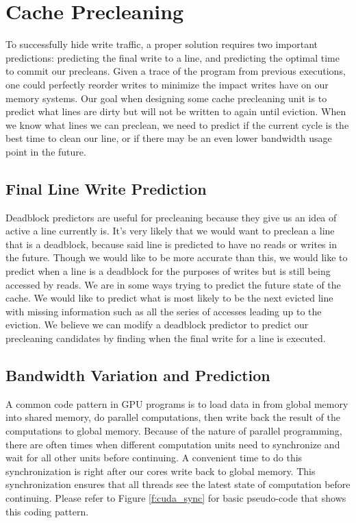 \section{Cache Precleaning}

To successfully hide write traffic, a proper solution requires two important predictions: predicting the final write to a line, and predicting the optimal time to commit our precleans. Given a trace of the program from previous executions, one could perfectly reorder writes to minimize the impact writes have on our memory systems. Our goal when designing some cache precleaning unit is to predict what lines are dirty but will not be written to again until eviction. When we know what lines we can preclean, we need to predict if the current cycle is the best time to clean our line, or if there may be an even lower bandwidth usage point in the future.  

\subsection{Final Line Write Prediction}
Deadblock predictors are useful for precleaning because they give us an idea of active a line currently is. It's very likely that we would want to preclean a line that is a deadblock, because said line is predicted to have no reads or writes in the future. Though we would like to be more accurate than this, we would like to predict when a line is a deadblock for the purposes of writes but is still being accessed by reads. We are in some ways trying to predict the future state of the cache. We would like to predict what is most likely to be the next evicted line with missing information such as all the series of accesses leading up to the eviction. We believe we can modify a deadblock predictor to predict our precleaning candidates by finding when the final write for a line is executed.

\subsection{Bandwidth Variation and Prediction}
A common code pattern in GPU programs is to load data in from global memory into shared memory, do parallel computations, then write back the result of the computations to global memory. Because of the nature of parallel programming, there are often times when different computation units need to synchronize and wait for all other units before continuing. A convenient time to do this synchronization is right after our cores write back to global memory. This synchronization ensures that all threads see the latest state of computation before continuing. Please refer to Figure \ref{f:cuda_sync} for basic pseudo-code that shows this coding pattern.

